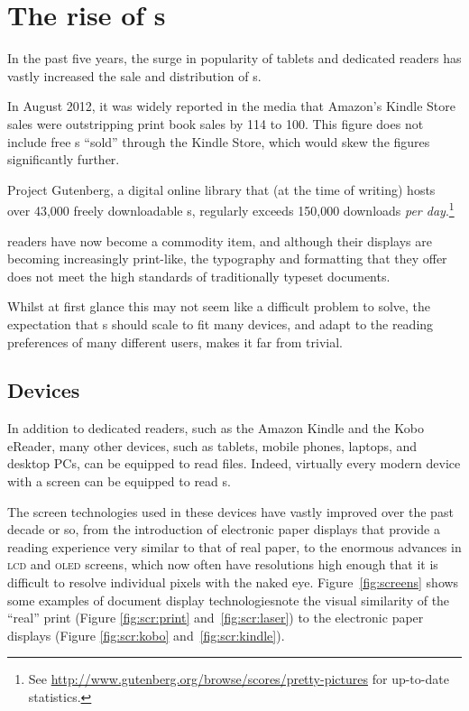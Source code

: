 \cleardoublepage
\chapter{The rise of \ebook{}s} \label{ch:intro}

In the past five years, the surge in popularity of tablets and dedicated \ebook{} readers has vastly increased the sale and distribution of \ebook{}s.

In August 2012, it was widely reported in the media that Amazon's Kindle Store sales were outstripping print book sales by 114 to 100. This figure does not include free \ebook{}s ``sold'' through the Kindle Store, which would skew the figures significantly further.

Project Gutenberg, a digital online library that (at the time of writing) hosts over 43,000 freely downloadable \ebook{}s, regularly exceeds 150,000 downloads \emph{per day}.\footnote{See \url{http://www.gutenberg.org/browse/scores/pretty-pictures} for up-to-date statistics.}

\Ebook{} readers have now become a commodity item, and although their displays are becoming increasingly print-like, the typography and formatting that they offer does not meet the high standards of traditionally typeset documents.

Whilst at first glance this may not seem like a difficult problem to solve, the expectation that \ebook{}s should scale to fit many devices, and adapt to the reading preferences of many different users, makes it far from trivial.

\section{Devices}

In addition to dedicated \ebook{} readers, such as the Amazon Kindle and the Kobo eReader, many other devices, such as tablets, mobile phones, laptops, and desktop PCs, can be equipped to read \ebook{} files. Indeed, virtually every modern device with a screen can be equipped to read \ebook{}s.

The screen technologies used in these devices have vastly improved over the past decade or so, from the introduction of electronic paper displays that provide a reading experience very similar to that of real paper, to the enormous advances in \textsc{lcd} and \textsc{oled} screens, which now often have resolutions high enough that it is difficult to resolve individual pixels with the naked eye. Figure~\ref{fig:screens} shows some examples of document display technologies\ed note the visual similarity of the ``real'' print (Figure \ref{fig:scr:print} and~\ref{fig:scr:laser}) to the electronic paper displays (Figure \ref{fig:scr:kobo} and~\ref{fig:scr:kindle}).

